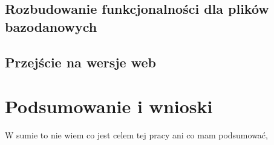 \documentclass[12pt,a4paper,twoside]{article}
\begin{document}
\subsection{Rozbudowanie funkcjonalności dla plików bazodanowych}
\subsection{Przejście na wersje web}
\section*{Podsumowanie i wnioski}
W sumie to nie wiem co jest celem tej pracy ani co mam podsumować, 
\listoffigures
{}
\end{document}
